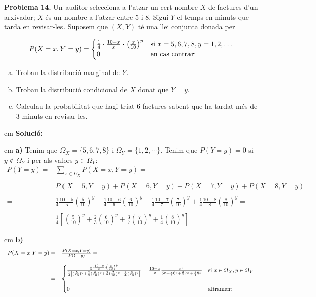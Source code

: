 \documentclass{article}
\begin{document}
\newpage
\noindent
\textbf{Problema 14.}  Un auditor selecciona a l'atzar un cert nombre $X$ de
factures d'un arxivador; $X$ \'es un nombre a l'atzar entre 5 i 8.
Sigui $Y$ el temps en minuts que tarda en revisar-les. Suposem que
$(X,Y)$ t\'e una llei conjunta donada per

\[
P(X = x, Y = y) = \begin{cases}
{1 \over 4} \cdot {10-x \over x} \cdot \left ( {x \over 10} \right )^y & \text{si } x = 5,6,7,8, y =
1,2,\ldots \\ 0 & \text{en cas contrari}
\end{cases}
\]
\begin{enumerate}[a)]
\item Trobau la distribuci\'o marginal de $Y.$
\item Trobau la distribuci\'o condicional de $X $  donat que $Y = y.$
\item  Calculau la probabilitat que hagi triat 6 factures sabent que
ha tardat m\'es de 3 minuts en revisar-les. 
\end{enumerate}

 cm
\noindent
\textbf{Soluci\'o:} 

 cm
\noindent
\textbf{a)} Tenim que $\Omega_X=\{5,6,7,8\}$ i $\Omega_Y=\{ 1, 2, \cdots \}$. 
Tenim que $P(Y=y)=0$ si $y \notin \Omega_Y$ i per als valors $y \in \Omega_Y$:
\[
\begin{array}{rl}
P(Y=y)=&\sum_{x \in \Omega_X} P(X=x, Y=y)= \\ \\
      =&P(X=5, Y=y)+P(X=6, Y=y)+P(X=7, Y=y)+P(X=8, Y=y)=\\ \\
      =& \frac{1}{4} \frac{10-5}{5} ( \frac{5}{10} )^y + \frac{1}{4} \frac{10-6}{6} ( \frac{6}{10} )^y +
      \frac{1}{4} \frac{10-7}{7} ( \frac{7}{10} )^y + \frac{1}{4} \frac{10-8}{8} ( \frac{8}{10} )^y=\\ \\
      =& \frac{1}{4} \left[ (\frac{5}{10})^y + \frac{2}{3} ( \frac{6}{10} )^y + \frac{3}{7} ( \frac{7}{10} )^y
+ \frac{1}{4} ( \frac{8}{10} )^y \right]
\end{array}
\]

 cm
\noindent
\textbf{b)} 
\[
\begin{array}{rl}
P(X=x | Y=y)=&\frac{P(X=x, Y=y)}{P(Y=y)}= \\ \\
=&\begin{cases} 
\frac{ {1 \over 4} \cdot {10-x \over x} \cdot \left ( {x \over 10} \right )^y }{ \frac{1}{4} \left[ (\frac{5}{10})^y + \frac{2}{3} ( \frac{6}{10} )^y + \frac{3}{7} ( \frac{7}{10} )^y + \frac{1}{4} ( \frac{8}{10} )^y \right] } = 
\frac{10-x}{x} \frac{x^y}{ 5^y+ \frac{2}{3} 6^y + \frac{3}{7} 7^y + \frac{1}{4} 8^y}
& 
\text{si } x\in \Omega_X, y \in \Omega_Y \\ \\
0 & \text{altrament}
\end{cases}
\end{array}
\]
\end{document}

